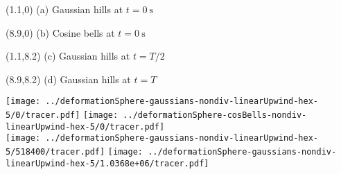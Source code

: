 \documentclass{article}
\begin{document}
\TPMargin{1pt}
\begin{textblock}{4}(1.1,0)
\normalsize
(a) Gaussian hills at $t=\SI{0}{\second}$
\end{textblock}
\begin{textblock}{4}(8.9,0)
\normalsize
(b) Cosine bells at $t=\SI{0}{\second}$
\end{textblock}
\begin{textblock}{4}(1.1,8.2)
\normalsize
(c) Gaussian hills at $t=T/2$
\end{textblock}
\begin{textblock}{4}(8.9,8.2)
\normalsize
(d) Gaussian hills at $t=T$
\end{textblock}
\vspace*{0.4em}
\texttt{[image: ../deformationSphere-gaussians-nondiv-linearUpwind-hex-5/0/tracer.pdf]}
\texttt{[image: ../deformationSphere-cosBells-nondiv-linearUpwind-hex-5/0/tracer.pdf]}
\vspace*{2.5em} \\
\texttt{[image: ../deformationSphere-gaussians-nondiv-linearUpwind-hex-5/518400/tracer.pdf]}
\texttt{[image: ../deformationSphere-gaussians-nondiv-linearUpwind-hex-5/1.0368e+06/tracer.pdf]}
\end{document}
